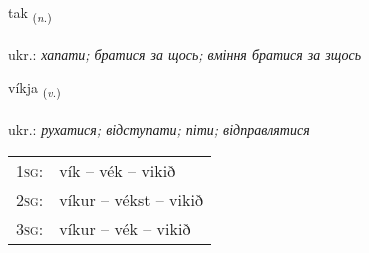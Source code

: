 \documentclass[frontgrid, backgrid]{flacards}\usepackage[]{graphicx}\usepackage[]{xcolor}
\begin{document}
\renewcommand{\flhead}{\vskip5pt \fboxsep=0pt {\small\bfseries\footnotesize Nafnorð | іменник}}
\renewcommand{\fcfoot}{\vskip5pt \fboxsep=0pt \hspace{2pt}{\small\bfseries\footnotesize 2K}}

\renewcommand{\blhead}{\vskip5pt {\small\bfseries\footnotesize Nafnorð | іменник }}
\renewcommand{\bcfoot}{\vskip5pt \hspace{2pt}{\small\bfseries\footnotesize 2K}}


{tak \small{\textsubscript{(\textit{n.})}} \\[1ex] %
\textphonetic{[tʰaːk]} \\
ukr.: \emph{хапати; братися за щось; вміння братися за зщось} \\  [2ex]
\renewcommand*{\arraystretch}{0.8}
}

\renewcommand{\flhead}{\vskip5pt \fboxsep=0pt {\small\bfseries\footnotesize Sagnorð | дієслово}}
\renewcommand{\fcfoot}{\vskip5pt \fboxsep=0pt \hspace{2pt}{\small\bfseries\footnotesize 2K}}

\renewcommand{\blhead}{\vskip5pt {\small\bfseries\footnotesize Sagnorð | дієслово }}
\renewcommand{\bcfoot}{\vskip5pt \hspace{2pt}{\small\bfseries\footnotesize 2K}}


{víkja \small{\textsubscript{(\textit{v.})}} \\[1ex] %
\textphonetic{[viːca]} \\
ukr.: \emph{рухатися; відступати; піти; відправлятися} \\  [2ex]
\renewcommand*{\arraystretch}{0.8}
\begin{tabular}{p{1cm}l}
\textsc{1sg}: & vík -- vék -- vikið \\ 
\textsc{2sg}: & víkur -- vékst -- vikið \\ 
\textsc{3sg}: & víkur -- vék -- vikið \\ 
\end{tabular}
}
\end{document}
